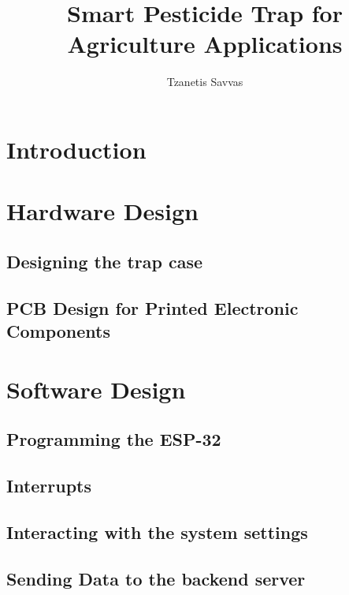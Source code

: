 \documentclass{article}
\title{Smart Pesticide Trap for Agriculture Applications}
\author{Tzanetis Savvas}
\begin{document}
\maketitle

\section{Introduction}

\section{Hardware Design}

\subsection{Designing the trap case}
\subsection{PCB Design for Printed Electronic Components}

\section{Software Design}

\subsection{Programming the ESP-32}
\subsection{Interrupts}
\subsection{Interacting with the system settings}
\subsection{Sending Data to the backend server}



\end{document}

